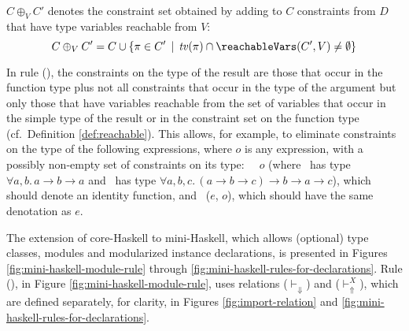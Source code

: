 
%




$C \oplus_V C'$ denotes the constraint set obtained by adding to $C$
constraints from $D$ that have type variables reachable from $V$:
  \[ C \oplus_V C' = C \cup \{ \pi \in C'\,\mid\, \tv(\pi) \cap \reachableVars(C',V) \not= \emptyset \} \]

In rule (\APP), the constraints on the type of the result are those
that occur in the function type plus not all constraints that occur in
the type of the argument but only those that have variables reachable
from the set of variables that occur in the simple type of the result
or in the constraint set on the function type (cf.~Definition
\ref{def:reachable}).  This allows, for example, to eliminate
constraints on the type of the following expressions, where $o$ is any
expression, with a possibly non-empty set of constraints on its type:
{\tt \flip\ \const\ $o$} (where \const\ has type $\forall a, b.\,a
\rightarrow b \rightarrow a$ and \flip\ has type $\forall a, b, c.\,(a
\rightarrow b \rightarrow c) \rightarrow b \rightarrow a\rightarrow
c$), which should denote an identity function, and \fst\ ($e$, $o$),
which should have the same denotation as $e$.

The extension of core-Haskell to mini-Haskell, which allows
(optional) type classes, modules and modularized instance
declarations, is presented in Figures
\ref{fig:mini-haskell-module-rule} through \ref{fig:mini-haskell-rules-for-declarations}. Rule (\MODULE), in Figure \ref{fig:mini-haskell-module-rule}, uses relations ($\vdash_{\Downarrow}$) and ($\vdash_{\Uparrow}^X$), which
are defined separately, for clarity, in Figures
\ref{fig:import-relation} and
\ref{fig:mini-haskell-rules-for-declarations}.

